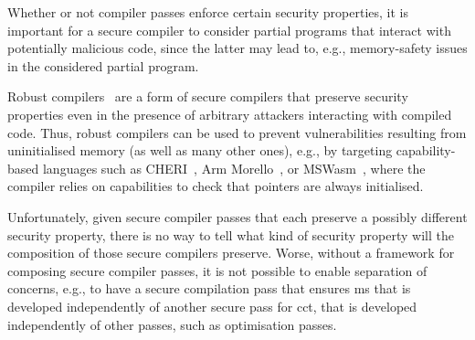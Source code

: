 \documentclass[dvipsnames,conference]{IEEEtran}
\theoremstyle{definition}
\begin{document}
Whether or not compiler passes enforce certain security properties, it is important for a secure compiler to consider partial programs that interact with potentially malicious code, since the latter may lead to, e.g., memory-safety issues in the considered partial program.

Robust compilers~\cite{abate2019jour} are a form of secure compilers that preserve security properties even in the presence of arbitrary attackers interacting with compiled code.
Thus, robust compilers can be used to prevent vulnerabilities resulting from uninitialised memory (as well as many other ones), e.g., by targeting capability-based languages such as CHERI~\cite{woodruff2014CHERI}, Arm Morello~\cite{arm-morello}, or MSWasm~\cite{michael2023mswasm}, where the compiler relies on capabilities to check that pointers are always initialised.


Unfortunately, given secure compiler passes that each preserve a possibly different security property, there is no way to tell what kind of security property will the composition of those secure compilers preserve.
Worse, without a framework for composing secure compiler passes, it is not possible to enable separation of concerns, e.g., to have a secure compilation pass that ensures \gls*{ms} that is developed independently of another secure pass for \gls*{cct}, that is developed independently of other passes, such as optimisation passes.
\end{document}
